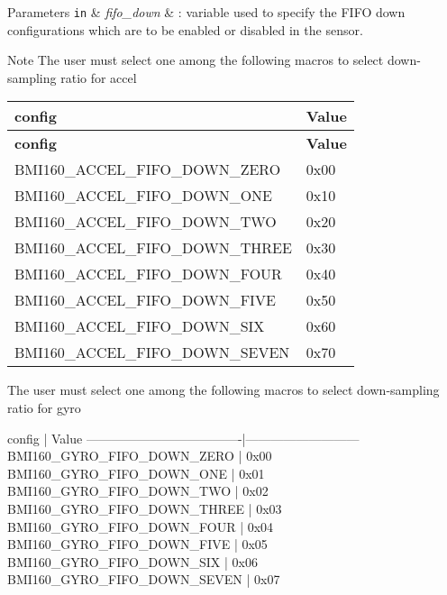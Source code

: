 \begin{DoxyParams}[1]{Parameters}
\mbox{\tt in}  & {\em fifo\+\_\+down} & \+: variable used to specify the F\+I\+FO down configurations which are to be enabled or disabled in the sensor.\\
\hline
\end{DoxyParams}
\begin{DoxyNote}{Note}
The user must select one among the following macros to select down-\/sampling ratio for accel \tabulinesep=1mm
\begin{longtabu} spread 0pt [c]{*{2}{|X[-1]}|}
\hline
\rowcolor{\tableheadbgcolor}\textbf{ config }&\textbf{ Value  }\\
\endfirsthead
\hline
\endfoot
\hline
\rowcolor{\tableheadbgcolor}\textbf{ config }&\textbf{ Value  }\\
\endhead
B\+M\+I160\+\_\+\+A\+C\+C\+E\+L\+\_\+\+F\+I\+F\+O\+\_\+\+D\+O\+W\+N\+\_\+\+Z\+E\+RO &0x00 \\
B\+M\+I160\+\_\+\+A\+C\+C\+E\+L\+\_\+\+F\+I\+F\+O\+\_\+\+D\+O\+W\+N\+\_\+\+O\+NE &0x10 \\
B\+M\+I160\+\_\+\+A\+C\+C\+E\+L\+\_\+\+F\+I\+F\+O\+\_\+\+D\+O\+W\+N\+\_\+\+T\+WO &0x20 \\
B\+M\+I160\+\_\+\+A\+C\+C\+E\+L\+\_\+\+F\+I\+F\+O\+\_\+\+D\+O\+W\+N\+\_\+\+T\+H\+R\+EE &0x30 \\
B\+M\+I160\+\_\+\+A\+C\+C\+E\+L\+\_\+\+F\+I\+F\+O\+\_\+\+D\+O\+W\+N\+\_\+\+F\+O\+UR &0x40 \\
B\+M\+I160\+\_\+\+A\+C\+C\+E\+L\+\_\+\+F\+I\+F\+O\+\_\+\+D\+O\+W\+N\+\_\+\+F\+I\+VE &0x50 \\
B\+M\+I160\+\_\+\+A\+C\+C\+E\+L\+\_\+\+F\+I\+F\+O\+\_\+\+D\+O\+W\+N\+\_\+\+S\+IX &0x60 \\
B\+M\+I160\+\_\+\+A\+C\+C\+E\+L\+\_\+\+F\+I\+F\+O\+\_\+\+D\+O\+W\+N\+\_\+\+S\+E\+V\+EN &0x70 \\
\end{longtabu}


The user must select one among the following macros to select down-\/sampling ratio for gyro \begin{DoxyVerb}config                               |   Value
-------------------------------------|---------------------------
BMI160_GYRO_FIFO_DOWN_ZERO           |   0x00
BMI160_GYRO_FIFO_DOWN_ONE            |   0x01
BMI160_GYRO_FIFO_DOWN_TWO            |   0x02
BMI160_GYRO_FIFO_DOWN_THREE          |   0x03
BMI160_GYRO_FIFO_DOWN_FOUR           |   0x04
BMI160_GYRO_FIFO_DOWN_FIVE           |   0x05
BMI160_GYRO_FIFO_DOWN_SIX            |   0x06
BMI160_GYRO_FIFO_DOWN_SEVEN          |   0x07
\end{DoxyVerb}



\end{DoxyNote}
